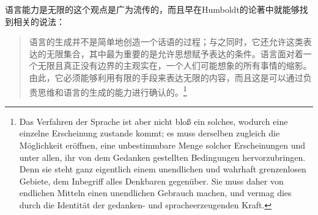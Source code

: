 语言能力是无限的这个观点是广为流传的，而且早在Humboldt的论著中就能够找到相关的说法：
\begin{quotation}
语言的生成并不是简单地创造一个话语的过程；与之同时，它还允许这类表达的无限集合，其中最为重要的是允许思想赋予表达的条件。语言面对着一个无限且真正没有边界的主观实在，一个人们可能想象的所有事情的缩影。由此，它必须能够利用有限的手段来表达无限的内容，而且这是可以通过负责思维和语言的生成的能力进行确认的。\citep[]{Humboldt88a-u}\footnote{%
Das Verfahren der Sprache ist aber nicht bloß ein solches, wodurch eine einzelne Erscheinung zustande kommt;
es muss derselben zugleich die Möglichkeit eröffnen, eine unbestimmbare Menge solcher Erscheinungen und unter allen,
ihr von dem Gedanken gestellten Bedingungen hervorzubringen.
Denn sie steht ganz eigentlich einem unendlichen und wahrhaft grenzenlosen Gebiete, dem Inbegriff alles
Denk\-baren gegenüber. Sie muss daher von endlichen Mitteln einen unendlichen Gebrauch machen, und
vermag dies durch die Identität der gedanken- und sprache\-erzeugenden Kraft.
}
\end{quotation}

